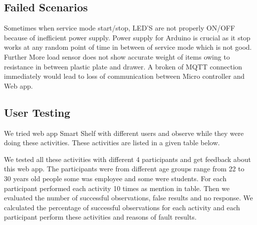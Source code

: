 \subsection{Failed Scenarios}
 Sometimes when service mode start/stop, LED'S are not properly ON/OFF because of inefficient power supply. Power supply for Arduino is crucial as it stop works at any random point of time in between of service mode which is not good. Further More load sensor does not show accurate weight of items owing to resistance in between plastic plate and drawer.
A broken of MQTT connection immediately would lead to loss of communication between Micro controller and Web app.
\subsection{User Testing} 
We tried web app Smart Shelf with different users and observe while they were doing these activities. These activities are listed in a given table below.


We tested all these activities with different 4 participants and get feedback about this web app. The participants were from different age groups range from 22 to 30 years old people some was employee and some were students. For each participant performed each activity 10 times as mention in table. Then we evaluated the number of successful observations, false results and no response. We calculated the percentage of successful observations for each activity and each participant perform these activities and reasons of fault results.

